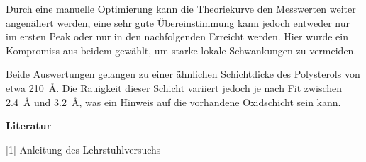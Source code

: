 Durch eine manuelle Optimierung kann die Theoriekurve den Messwerten weiter angenähert werden, eine sehr gute Übereinstimmung kann jedoch entweder nur im ersten Peak oder nur in den nachfolgenden Erreicht werden. Hier wurde ein Kompromiss aus beidem gewählt, um starke lokale Schwankungen zu vermeiden.

Beide Auswertungen gelangen zu einer ähnlichen Schichtdicke des Polysterols von etwa \SI{210}{\angstrom}.
Die Rauigkeit dieser Schicht variiert jedoch je nach Fit zwischen \SI{2.4}{\angstrom} und \SI{3.2}{\angstrom}, was ein Hinweis auf die vorhandene Oxidschicht sein kann.



\vspace{2cm}
\textbf{Literatur}

\vspace{0.3cm}
[1] Anleitung des Lehrstuhlversuchs






